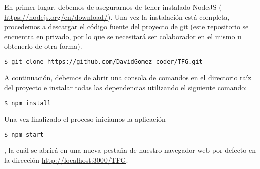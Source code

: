 \documentclass[../main.tex]{subfiles}
\begin{document}
En primer lugar, debemos de asegurarnos de tener instalado NodeJS (\url{ https://nodejs.org/en/download/}). Una vez la instalación está completa, procedemos a descargar el código fuente del proyecto de git (este repositorio se encuentra en privado, por lo que se necesitará ser colaborador en el mismo u obtenerlo de otra forma).

\begin{lstlisting}[language=bash]
  $ git clone https://github.com/DavidGomez-coder/TFG.git
\end{lstlisting}

A continuación, debemos de abrir una consola de comandos en el directorio raíz del proyecto e instalar todas las dependencias utilizando el siguiente comando:

\begin{lstlisting}[language=bash]
  $ npm install
\end{lstlisting}

Una vez finalizado el proceso iniciamos la aplicación

\begin{lstlisting}[language=bash]
  $ npm start
\end{lstlisting}

, la cuál se abrirá en una nueva pestaña de nuestro navegador web por defecto en la dirección \url{http://localhost:3000/TFG}.
\end{document}

